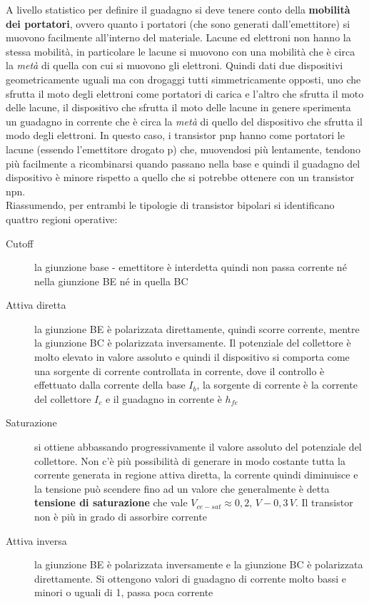 \documentclass[12pt, a4paper]{report}
\begin{document}
A livello statistico per definire il guadagno si deve tenere conto della \textbf{mobilità dei portatori}, ovvero quanto i portatori (che sono generati dall'emettitore) si muovono facilmente all'interno del materiale. Lacune ed elettroni non hanno la stessa mobilità, in particolare le lacune si muovono con una mobilità che è circa la \textit{metà} di quella con cui si muovono gli elettroni. Quindi dati due dispositivi geometricamente uguali ma con drogaggi tutti simmetricamente opposti, uno che sfrutta il moto degli elettroni come portatori di carica e l'altro che sfrutta il moto delle lacune, il dispositivo che sfrutta il moto delle lacune in genere sperimenta un guadagno in corrente che è circa la \textit{metà} di quello del dispositivo che sfrutta il modo degli elettroni. In questo caso, i transistor pnp hanno come portatori le lacune (essendo l'emettitore drogato p) che, muovendosi più lentamente, tendono più facilmente a ricombinarsi quando passano nella base e quindi il guadagno del dispositivo è minore rispetto a quello che si potrebbe ottenere con un transistor npn.\\

Riassumendo, per entrambi le tipologie di transistor bipolari si identificano quattro regioni operative:
\begin{description}
    \item[Cutoff] la giunzione base - emettitore è interdetta quindi non passa corrente né nella giunzione BE né in quella BC
    \item[Attiva diretta] la giunzione BE è polarizzata direttamente, quindi scorre corrente, mentre la giunzione BC è polarizzata inversamente. Il potenziale del collettore è molto elevato in valore assoluto e quindi il dispositivo si comporta come una sorgente di corrente controllata in corrente, dove il controllo è effettuato dalla corrente della base $I_{b}$, la sorgente di corrente è la corrente del collettore $I_{c}$ e il guadagno in corrente è $h_{fe}$
    \item[Saturazione] si ottiene abbassando progressivamente il valore assoluto del potenziale del collettore. Non c'è più possibilità di generare in modo costante tutta la corrente generata in regione attiva diretta, la corrente quindi diminuisce e la tensione può scendere fino ad un valore che generalmente è detta \textbf{tensione di saturazione} che vale $V_{ce-sat} \approx 0,2,\,V - 0,3\,V$. Il transistor non è più in grado di assorbire corrente
    \item[Attiva inversa] la giunzione BE è polarizzata inversamente e la giunzione BC è polarizzata direttamente. Si ottengono valori di guadagno di corrente molto bassi e minori o uguali di 1, passa poca corrente
\end{description}
\end{document}
